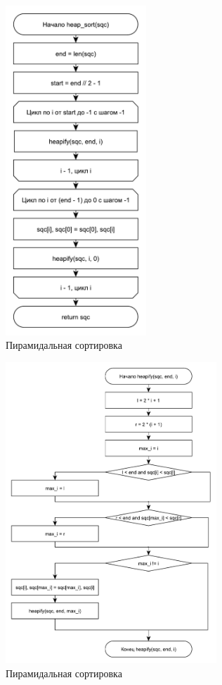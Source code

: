 \documentclass[12pt,a4paper]{scrartcl}
\begin{document}
		\begin{figure}[H]
			\centering
			\includegraphics[width=200px]{2.pdf}
			\caption{Пирамидальная сортировка}
			\label{graph2.2}
		\end{figure}

		\begin{figure}[H]
			\centering
			\includegraphics[width=300px]{21.pdf}
			\caption{Пирамидальная сортировка}
			\label{graph2.3}
		\end{figure}
\end{document}
